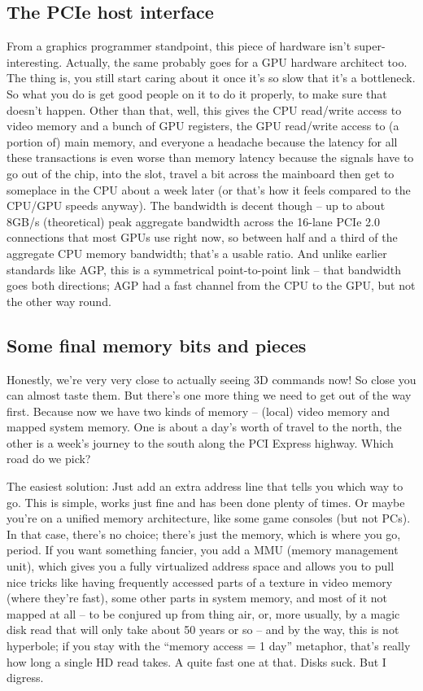 \documentclass[12pt]{article}
\begin{document}
\subsection{The PCIe host interface}
\label{sec:org86cdef6}

From a graphics programmer standpoint, this piece of hardware isn’t super-interesting. Actually, the same probably goes for a GPU hardware architect too. The thing is, you still start caring about it once it’s so slow that it’s a bottleneck. So what you do is get good people on it to do it properly, to make sure that doesn’t happen. Other than that, well, this gives the CPU read/write access to video memory and a bunch of GPU registers, the GPU read/write access to (a portion of) main memory, and everyone a headache because the latency for all these transactions is even worse than memory latency because the signals have to go out of the chip, into the slot, travel a bit across the mainboard then get to someplace in the CPU about a week later (or that’s how it feels compared to the CPU/GPU speeds anyway). The bandwidth is decent though – up to about 8GB/s (theoretical) peak aggregate bandwidth across the 16-lane PCIe 2.0 connections that most GPUs use right now, so between half and a third of the aggregate CPU memory bandwidth; that’s a usable ratio. And unlike earlier standards like AGP, this is a symmetrical point-to-point link – that bandwidth goes both directions; AGP had a fast channel from the CPU to the GPU, but not the other way round.

\subsection{Some final memory bits and pieces}
\label{sec:orgb6418fa}

Honestly, we’re very very close to actually seeing 3D commands now! So close you can almost taste them. But there’s one more thing we need to get out of the way first. Because now we have two kinds of memory – (local) video memory and mapped system memory. One is about a day’s worth of travel to the north, the other is a week’s journey to the south along the PCI Express highway. Which road do we pick?

The easiest solution: Just add an extra address line that tells you which way to go. This is simple, works just fine and has been done plenty of times. Or maybe you’re on a unified memory architecture, like some game consoles (but not PCs). In that case, there’s no choice; there’s just the memory, which is where you go, period. If you want something fancier, you add a MMU (memory management unit), which gives you a fully virtualized address space and allows you to pull nice tricks like having frequently accessed parts of a texture in video memory (where they’re fast), some other parts in system memory, and most of it not mapped at all – to be conjured up from thing air, or, more usually, by a magic disk read that will only take about 50 years or so – and by the way, this is not hyperbole; if you stay with the “memory access = 1 day” metaphor, that’s really how long a single HD read takes. A quite fast one at that. Disks suck. But I digress.
\end{document}
